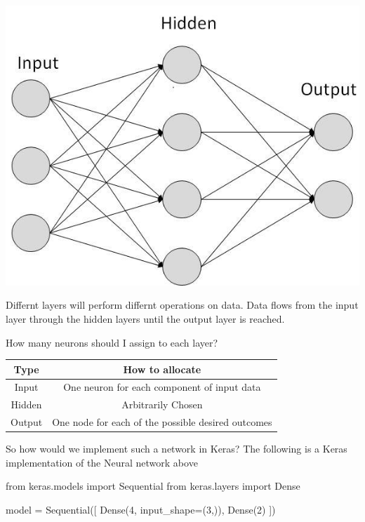 \documentclass[
]{article}
\newenvironment{Shaded}{}{}
\newcommand{\DecValTok}[1]{\textcolor[rgb]{0.25,0.63,0.44}{#1}}
\newcommand{\ImportTok}[1]{#1}
\newcommand{\NormalTok}[1]{#1}
\newcommand{\OperatorTok}[1]{\textcolor[rgb]{0.40,0.40,0.40}{#1}}
\begin{document}
\includegraphics{images/neural-net.jpg}

Differnt layers will perform differnt operations on data. Data flows
from the input layer through the hidden layers until the output layer is
reached.

How many neurons should I assign to each layer?

\begin{longtable}[]{@{}cc@{}}
\toprule
Type & How to allocate\tabularnewline
\midrule
\endhead
Input & One neuron for each component of input data\tabularnewline
Hidden & Arbitrarily Chosen\tabularnewline
Output & One node for each of the possible desired
outcomes\tabularnewline
\bottomrule
\end{longtable}

So how would we implement such a network in Keras? The following is a
Keras implementation of the Neural network above

\begin{Shaded}
\begin{Highlighting}[]
\ImportTok{from}\NormalTok{ keras.models }\ImportTok{import}\NormalTok{ Sequential}
\ImportTok{from}\NormalTok{ keras.layers }\ImportTok{import}\NormalTok{ Dense}

\NormalTok{model }\OperatorTok{=}\NormalTok{ Sequential([}
\NormalTok{    Dense(}\DecValTok{4}\NormalTok{, input\_shape}\OperatorTok{=}\NormalTok{(}\DecValTok{3}\NormalTok{,)),}
\NormalTok{    Dense(}\DecValTok{2}\NormalTok{)}
\NormalTok{])}
\end{Highlighting}
\end{Shaded}
\end{document}
